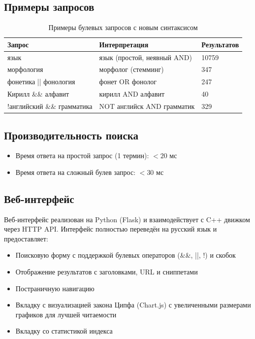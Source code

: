 \subsection{Примеры запросов}

\begin{table}[H]
\centering
\begin{tabular}{lll}
\toprule
\textbf{Запрос} & \textbf{Интерпретация} & \textbf{Результатов} \\
\midrule
язык & язык (простой, неявный AND) & 10759 \\
морфология & морфолог (стемминг) & 347 \\
фонетика || фонология & фонет OR фонолог & 247 \\
Кирилл \&\& алфавит & кирилл AND алфавит & 40 \\
!английский \&\& грамматика & NOT английск AND грамматик & 329 \\
\bottomrule
\end{tabular}
\caption{Примеры булевых запросов с новым синтаксисом}
\end{table}

\subsection{Производительность поиска}

\begin{itemize}
    \item Время ответа на простой запрос (1 термин): $< 20$ мс
    \item Время ответа на сложный булев запрос: $<  30$ мс
\end{itemize}

\subsection{Веб-интерфейс}

Веб-интерфейс реализован на Python (Flask) и взаимодействует с C++ движком через HTTP API. Интерфейс полностью переведён на русский язык и предоставляет:
\begin{itemize}
    \item Поисковую форму с поддержкой булевых операторов (\&\&, ||, !) и скобок
    \item Отображение результатов с заголовками, URL и сниппетами
    \item Постраничную навигацию
    \item Вкладку с визуализацией закона Ципфа (Chart.js) с увеличенными размерами графиков для лучшей читаемости
    \item Вкладку со статистикой индекса
\end{itemize}

